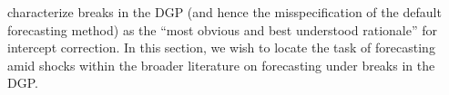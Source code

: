 \documentclass{uiucthesis2021}
\theoremstyle{definition}
\begin{document}
  
  
  
   \cite[][p. 177]{hendry1994theory} characterize breaks in the DGP (and hence the misspecification of the default forecasting method) as the ``most obvious and best understood rationale'' for intercept correction.  In this section, we wish to locate the task of forecasting amid shocks within the broader literature on forecasting under breaks in the DGP. 
  
\end{document}
